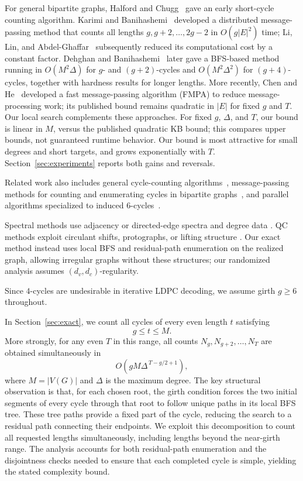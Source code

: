 \documentclass[conference]{IEEEtran}
\begin{document}
For general bipartite graphs, Halford and Chugg~\cite{halford2006} gave an
early short-cycle counting algorithm. Karimi and
Banihashemi~\cite{karimi2013} developed a distributed message-passing method
that counts all lengths $g,g+2,\ldots,2g-2$ in $O(g|E|^2)$ time; Li, Lin,
and Abdel-Ghaffar~\cite{li2015} subsequently reduced its computational cost
by a constant factor. Dehghan and Banihashemi~\cite{dehghan2020} later gave
a BFS-based method running in $O(M^2\Delta)$ for $g$- and $(g+2)$-cycles
and $O(M^2\Delta^2)$ for $(g+4)$-cycles, together with hardness results for
longer lengths. More recently, Chen and He~\cite{chen2025fmpa}
developed a fast message-passing algorithm (FMPA) to reduce message-processing work; its published bound
remains quadratic in $|E|$ for fixed $g$ and $T$.
Our local search complements these approaches.
For fixed $g$, $\Delta$, and $T$, our bound is linear in $M$, versus the
published quadratic KB bound; this compares upper bounds, not guaranteed
runtime behavior. Our bound is most attractive for small degrees and
short targets, and grows exponentially with $T$.
Section~\ref{sec:experiments} reports both gains and reversals.

Related work also includes general cycle-counting
algorithms~\cite{alon1997}, message-passing methods for counting
and enumerating cycles in bipartite graphs~\cite{yang2017},
and parallel algorithms specialized to induced
$6$-cycles~\cite{niu2025}.

Spectral methods use adjacency or directed-edge spectra and degree data
\cite{blake2018,dehghan2019,dehghan2020directed}.
QC methods exploit circulant shifts, protographs, or lifting structure
\cite{fossorier2004,karimi2012qc,gomez2023}.
Our exact method instead uses local BFS and residual-path enumeration
on the realized graph, allowing irregular graphs without these structures;
our randomized analysis assumes $(d_v,d_c)$-regularity.

Since $4$-cycles are undesirable in iterative LDPC
decoding, we assume girth $g\ge6$ throughout.

In Section~\ref{sec:exact}, we count all cycles
of every even length $t$ satisfying
\begin{equation}\label{eq:range}
 g\le t\le M.
\end{equation}
More strongly, for any even $T$ in this range, all counts
$N_g,N_{g+2},\ldots,N_T$ are obtained simultaneously in
\begin{equation}\label{eq:maincomplexity}
 O\!\left(gM\Delta^{\,T-g/2+1}\right),
\end{equation}
where $M=|V(G)|$ and $\Delta$ is the maximum degree. The key structural observation is that, for each chosen root, the girth
condition forces the two initial segments of every cycle through that
root to follow unique paths in its local BFS tree. These tree paths
provide a fixed part of the cycle, reducing the search to a residual
path connecting their endpoints. We exploit this decomposition to count
all requested lengths simultaneously, including lengths beyond the
near-girth range. The analysis accounts for both residual-path
enumeration and the disjointness checks needed to ensure that each
completed cycle is simple, yielding the stated complexity bound.
\end{document}

